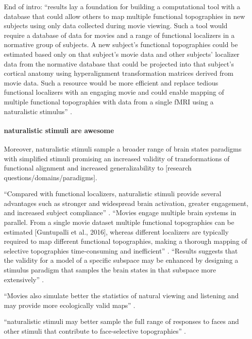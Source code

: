 %
End of intro: ``results lay a foundation for building a computational tool
with a database that could allow others to map multiple functional topographies
in new subjects using only data collected during movie viewing.
%
Such a tool would require a database of data for movies and a range of
functional localizers in a normative group of subjects.
%
A new subject's functional topographies could be estimated based only on that
subject's movie data and other subjects' localizer data from the normative
database that could be projected into that subject's cortical anatomy using
hyperalignment transformation matrices derived from movie data.
%
Such a resource would be more efficient and replace tedious functional
localizers with an engaging movie and could enable mapping of multiple
functional topographies with data from a single fMRI using a naturalistic
stimulus'' \citep{jiahui2020predicting}.


\paragraph{naturalistic stimuli are awesome}

%
Moreover, naturalistic stimuli sample a broader range of brain states paradigms
with simplified stimuli \citep{guntupalli2016model, haxby2011common} promising
an increased validity of transformations of functional alignment and increased
generalizability to [research questions/domains/paradigms].

%
``Compared with functional localizers, naturalistic stimuli provide several
advantages such as stronger and widespread brain activation, greater engagement,
and increased subject compliance'' \citep{jiahui2020predicting}.
%
``Movies engage multiple brain systems in parallel. From a single movie dataset
multiple functional topographies can be estimated [Guntupalli et al., 2016],
whereas different localizers are typically required to map different functional
topographies, making a thorough mapping of selective topographies time-consuming
and inefficient'' \citep{jiahui2020predicting}.
%
``Results suggests that the validity for a model of a specific subspace may be
enhanced by designing a stimulus paradigm that samples the brain states in that
subspace more extensively'' \citep{haxby2011common}.

``Movies also simulate better the statistics of natural viewing and listening
and may provide more ecologically valid maps'' \citep{jiahui2020predicting}.

%
``naturalistic stimuli may better sample the full range of responses to faces
and other stimuli that contribute to face-selective topographies''
\citep{jiahui2020predicting}.

